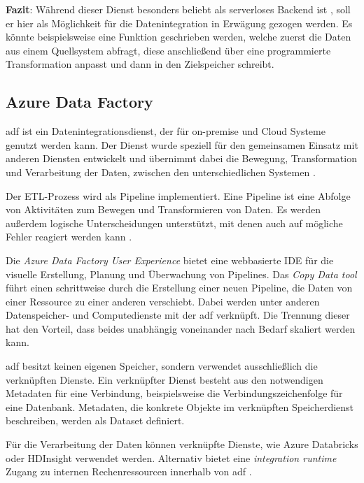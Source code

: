 \textbf{Fazit}: Während dieser Dienst besonders beliebt als serverloses Backend ist \cite[vgl.][]{satapathi_hands-azure_2021}, soll er hier als Möglichkeit für die Datenintegration in Erwägung gezogen werden. Es könnte beispielsweise eine Funktion geschrieben werden, welche zuerst die Daten aus einem Quellsystem abfragt, diese anschließend über eine programmierte Transformation anpasst und dann in den Zielspeicher schreibt.


\subsection{Azure Data Factory} \label{sec:grundlagen:azure_dienste:dataFactory}
\ac{adf} ist ein Datenintegrationsdienst, der für on-premise und Cloud Systeme genutzt werden kann. Der Dienst wurde speziell für den gemeinsamen Einsatz mit anderen Diensten entwickelt und übernimmt dabei die Bewegung, Transformation und Verarbeitung der Daten, zwischen den unterschiedlichen Systemen \cite{klein_iot_2017}.

Der ETL-Prozess wird als Pipeline implementiert. Eine Pipeline ist eine Abfolge von Aktivitäten zum Bewegen und Transformieren von Daten. Es werden außerdem logische Unterscheidungen unterstützt, mit denen auch auf mögliche Fehler reagiert werden kann \cite{zhu_pipeline_2021}.

Die \textit{Azure Data Factory User Experience} bietet eine webbasierte IDE für die visuelle Erstellung, Planung und Überwachung von Pipelines. Das \textit{Copy Data tool} führt einen schrittweise durch die Erstellung einer neuen Pipeline, die Daten von einer Ressource zu einer anderen verschiebt. Dabei werden unter anderen Datenspeicher- und Computedienste mit der \ac{adf} verknüpft. Die Trennung dieser hat den Vorteil, dass beides unabhängig voneinander nach Bedarf skaliert werden kann.

\ac{adf} besitzt keinen eigenen Speicher, sondern verwendet ausschließlich die verknüpften Dienste. Ein verknüpfter Dienst besteht aus den notwendigen Metadaten für eine Verbindung, beispielsweise die Verbindungszeichenfolge für eine Datenbank. Metadaten, die konkrete Objekte im verknüpften Speicherdienst beschreiben, werden als Dataset definiert. 

Für die Verarbeitung der Daten können verknüpfte Dienste, wie Azure Databricks oder HDInsight verwendet werden. Alternativ bietet eine \textit{integration runtime} Zugang zu internen Rechenressourcen innerhalb von \ac{adf} \cite{swinbank_your_2021}.

